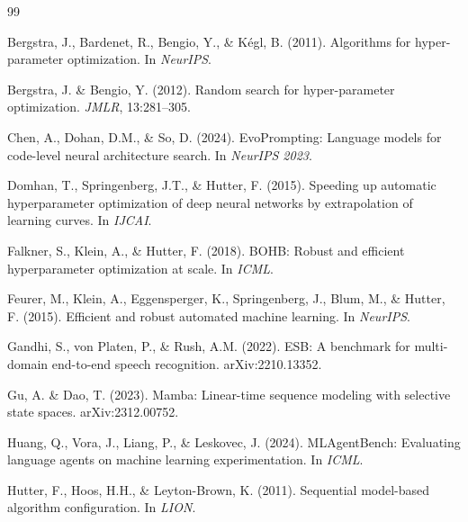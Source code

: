 \documentclass{article}
\begin{document}

\begin{thebibliography}{99}

Bergstra, J., Bardenet, R., Bengio, Y., \& K{\'e}gl, B. (2011).
\newblock Algorithms for hyper-parameter optimization.
\newblock In \emph{NeurIPS}.

Bergstra, J. \& Bengio, Y. (2012).
\newblock Random search for hyper-parameter optimization.
\newblock \emph{JMLR}, 13:281--305.

Chen, A., Dohan, D.M., \& So, D. (2024).
\newblock EvoPrompting: Language models for code-level neural architecture search.
\newblock In \emph{NeurIPS 2023}.

Domhan, T., Springenberg, J.T., \& Hutter, F. (2015).
\newblock Speeding up automatic hyperparameter optimization of deep neural networks by extrapolation of learning curves.
\newblock In \emph{IJCAI}.

Falkner, S., Klein, A., \& Hutter, F. (2018).
\newblock BOHB: Robust and efficient hyperparameter optimization at scale.
\newblock In \emph{ICML}.

Feurer, M., Klein, A., Eggensperger, K., Springenberg, J., Blum, M., \& Hutter, F. (2015).
\newblock Efficient and robust automated machine learning.
\newblock In \emph{NeurIPS}.

Gandhi, S., von Platen, P., \& Rush, A.M. (2022).
\newblock ESB: A benchmark for multi-domain end-to-end speech recognition.
\newblock arXiv:2210.13352.

Gu, A. \& Dao, T. (2023).
\newblock Mamba: Linear-time sequence modeling with selective state spaces.
\newblock arXiv:2312.00752.

Huang, Q., Vora, J., Liang, P., \& Leskovec, J. (2024).
\newblock MLAgentBench: Evaluating language agents on machine learning experimentation.
\newblock In \emph{ICML}.

Hutter, F., Hoos, H.H., \& Leyton-Brown, K. (2011).
\newblock Sequential model-based algorithm configuration.
\newblock In \emph{LION}.


\end{thebibliography}
\end{document}
